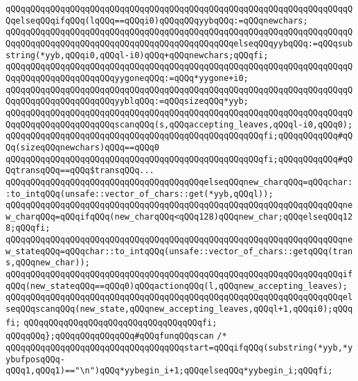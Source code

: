 \verb|qQQqqQQqqQQqqQQqqQQqqQQqqQQqqQQqqQQqqQQqqQQqqQQqqQQqqQQqqQQqqQQqqQQqqQQqelseqQQqifqQQq(lqQQq==qQQqi0)qQQqqQQqyybqQQq:=qQQqnewchars;|\newline
\verb|qQQqqQQqqQQqqQQqqQQqqQQqqQQqqQQqqQQqqQQqqQQqqQQqqQQqqQQqqQQqqQQqqQQqqQQqqQQqqQQqqQQqqQQqqQQqqQQqqQQqqQQqqQQqqQQqqQQqelseqQQqyybqQQq:=qQQqsubstring(*yyb,qQQqi0,qQQql-i0)qQQq+qQQqnewchars;qQQqfi;|\newline
\verb|qQQqqQQqqQQqqQQqqQQqqQQqqQQqqQQqqQQqqQQqqQQqqQQqqQQqqQQqqQQqqQQqqQQqqQQqqQQqqQQqqQQqqQQqqQQqyygoneqQQq:=qQQq*yygone+i0;|\newline
\verb|qQQqqQQqqQQqqQQqqQQqqQQqqQQqqQQqqQQqqQQqqQQqqQQqqQQqqQQqqQQqqQQqqQQqqQQqqQQqqQQqqQQqqQQqqQQqyyblqQQq:=qQQqsizeqQQq*yyb;|\newline
\verb|qQQqqQQqqQQqqQQqqQQqqQQqqQQqqQQqqQQqqQQqqQQqqQQqqQQqqQQqqQQqqQQqqQQqqQQqqQQqqQQqqQQqqQQqqQQqscanqQQq(s,qQQqaccepting_leaves,qQQql-i0,qQQq0);|\newline
\verb|qQQqqQQqqQQqqQQqqQQqqQQqqQQqqQQqqQQqqQQqqQQqqQQqqQQqfi;qQQqqQQqqQQq#qQQq(sizeqQQqnewchars)qQQq==qQQq0|\newline
\verb|qQQqqQQqqQQqqQQqqQQqqQQqqQQqqQQqqQQqqQQqqQQqqQQqqQQqfi;qQQqqQQqqQQq#qQQqtransqQQq==qQQq$transqQQq...|\newline
\verb|qQQqqQQqqQQqqQQqqQQqqQQqqQQqqQQqqQQqqQQqelseqQQqnew_charqQQq=qQQqchar::to_intqQQq(unsafe::vector_of_chars::get(*yyb,qQQql));|\newline
\verb|qQQqqQQqqQQqqQQqqQQqqQQqqQQqqQQqqQQqqQQqqQQqqQQqqQQqqQQqqQQqqQQqqQQqnew_charqQQq=qQQqifqQQq(new_charqQQq<qQQq128)qQQqnew_char;qQQqelseqQQq128;qQQqfi;|\newline
\verb|qQQqqQQqqQQqqQQqqQQqqQQqqQQqqQQqqQQqqQQqqQQqqQQqqQQqqQQqqQQqqQQqqQQqnew_stateqQQq=qQQqchar::to_intqQQq(unsafe::vector_of_chars::getqQQq(trans,qQQqnew_char));|\newline
\verb|qQQqqQQqqQQqqQQqqQQqqQQqqQQqqQQqqQQqqQQqqQQqqQQqqQQqqQQqqQQqqQQqqQQqifqQQq(new_stateqQQq==qQQq0)qQQqactionqQQq(l,qQQqnew_accepting_leaves);|\newline
\verb|qQQqqQQqqQQqqQQqqQQqqQQqqQQqqQQqqQQqqQQqqQQqqQQqqQQqqQQqqQQqqQQqqQQqelseqQQqscanqQQq(new_state,qQQqnew_accepting_leaves,qQQql+1,qQQqi0);qQQqfi;|\newline
\verb|qQQqqQQqqQQqqQQqqQQqqQQqqQQqqQQqqQQqfi;|\newline
\verb|qQQqqQQq};qQQqqQQqqQQqqQQq#qQQqfunqQQqscan|\newline
\verb|/*|\newline
\verb|qQQqqQQqqQQqqQQqqQQqqQQqqQQqqQQqqQQqstart=qQQqifqQQq(substring(*yyb,*yybufposqQQq-qQQq1,qQQq1)=="\n")qQQq*yybegin_i+1;qQQqelseqQQq*yybegin_i;qQQqfi;|\newline
